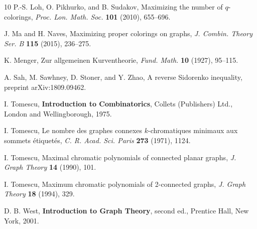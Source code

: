 \documentclass[11pt]{article}
\theoremstyle{plain}
\theoremstyle{definition}
\theoremstyle{remark}
\begin{document}
\begin{thebibliography}{10}
P.-S. Loh, O. Pikhurko, and B. Sudakov, Maximizing the number of $q$-colorings, {\em Proc. Lon.
Math. Soc.} {\bf 101} (2010), 655--696.

J. Ma and H. Naves, Maximizing proper colorings on graphs, {\em J. Combin. Theory Ser. B} {\bf 115}
(2015), 236--275.

K. Menger, Zur allgemeinen Kurventheorie, {\em Fund. Math.} {\bf 10}
(1927), 95--115.

A. Sah, M. Sawhney, D. Stoner, and Y. Zhao, A reverse Sidorenko inequality, preprint arXiv:1809.09462.

I. Tomescu, {\bf Introduction to Combinatorics}, Collets (Publishers) Ltd., London and Wellingborough,
1975.

I. Tomescu, Le nombre des graphes connexes $k$-chromatiques
minimaux aux sommets \'etiquet\'es, \emph{C. R. Acad. Sci. Paris} \textbf{273}
(1971), 1124. 

I. Tomescu, Maximal chromatic polynomials of connected planar graphs, {\it J. Graph Theory} {\bf 14} (1990), 101.

I. Tomescu, Maximum chromatic polynomials of 2-connected graphs, {\it J. Graph Theory} {\bf 18} (1994), 329.

D. B. West, {\bf Introduction to Graph Theory}, second ed., Prentice Hall, New York, 2001.

\end{thebibliography}
\end{document}
